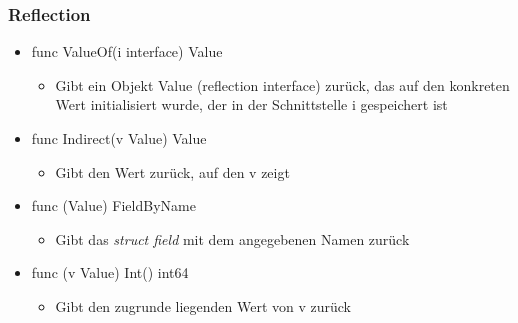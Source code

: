 \documentclass{beamer}
\begin{document}
\begin{frame}
\frametitle{Reflection}

\begin{itemize}
\setlength{\itemsep}{24pt}
\item func ValueOf(i interface{}) Value
\begin{itemize}
\item Gibt ein Objekt Value (reflection interface) zurück, das auf den konkreten Wert initialisiert wurde, der in der Schnittstelle i gespeichert ist
\end{itemize}
\item func Indirect(v Value) Value
\begin{itemize}
\item Gibt den Wert zurück, auf den v zeigt
\end{itemize}
\item func (Value) FieldByName
\begin{itemize}
\item Gibt das \textit{struct field} mit dem angegebenen Namen zur\"uck
\end{itemize}
\item func (v Value) Int() int64
\begin{itemize}
\item Gibt den zugrunde liegenden Wert von v zur\"uck
\end{itemize}
\end{itemize}

\end{frame}

\end{document}
